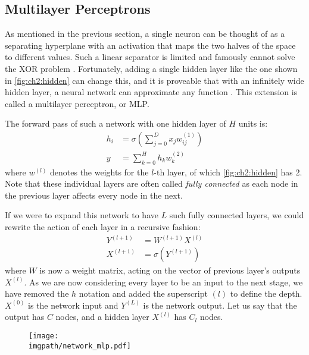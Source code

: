 \subsection{Multilayer Perceptrons}
As mentioned in the previous section, a single neuron can be thought of as a
separating hyperplane with an activation that maps the two halves of the space
to different values. Such a linear separator is limited and famously cannot
solve the XOR problem \cite{minsky_perceptrons:_1988}. Fortunately, adding a
single hidden layer like the one shown in \autoref{fig:ch2:hidden} can change
this, and it is proveable that with an infinitely wide hidden layer, a neural
network can approximate any function \cite{hornik_multilayer_1989,
cybenko_approximation_1989}. This extension is called a multilayer perceptron,
or MLP.

The forward pass of such a network with one hidden layer of $H$ units is:
%
\begin{align}
  h_i & =  \sigma\left(\sum_{j=0}^{D} x_j w_{ij}^{(1)}\right) \\
  y & =  \sum_{k=0}^{H} h_k w^{(2)}_{k}
\end{align}
%
where $w^{(l)}$ denotes the weights for the $l$-th layer, of which
\autoref{fig:ch2:hidden} has 2. Note that these individual layers are often
called \emph{fully connected} as each node in the previous layer affects every
node in the next.

If we were to expand this network to have $L$ such fully connected layers, we
could rewrite the action of each layer in a recursive fashion:
%
\begin{align}
  Y^{(l+1)} &= W^{(l+1)}X^{(l)}  \label{eq:ch2:fc1}\\
  X^{(l+1)} &= \sigma\left(Y^{(l+1)}\right) \label{eq:ch2:fc2}
\end{align}
where $W$ is now a weight matrix, acting on the vector of previous layer's
outputs $X^{(l)}$. As we are now considering every layer to be an input to the next
stage, we have removed the $h$ notation and added the superscript $(l)$ to
define the depth. $X^{(0)}$ is the network input and $Y^{(L)}$ is the network
output. Let us say that the output has $C$ nodes, and a hidden layer $X^{(l)}$
has $C_l$ nodes.

\begin{figure}[t]
  \centering
  \texttt{[image: \\imgpath/network\_mlp.pdf]}
  \label{fig:ch2:hidden}
\end{figure}

